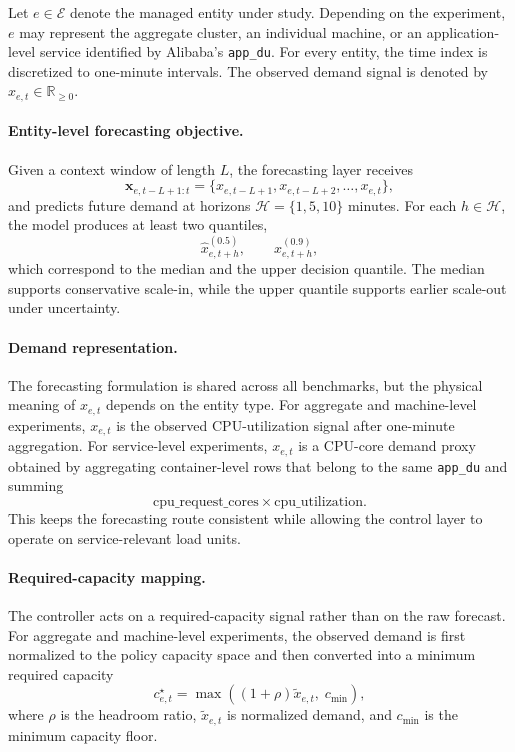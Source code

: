 Let $e \in \mathcal{E}$ denote the managed entity under study. Depending on the experiment, $e$ may represent the aggregate cluster, an individual machine, or an application-level service identified by Alibaba's \texttt{app\_du}. For every entity, the time index is discretized to one-minute intervals. The observed demand signal is denoted by $x_{e,t} \in \mathbb{R}_{\ge 0}$.

\paragraph{Entity-level forecasting objective.}
Given a context window of length $L$, the forecasting layer receives
\[
\mathbf{x}_{e,t-L+1:t} = \{x_{e,t-L+1}, x_{e,t-L+2}, \dots, x_{e,t}\},
\]
and predicts future demand at horizons $\mathcal{H}=\{1,5,10\}$ minutes. For each $h \in \mathcal{H}$, the model produces at least two quantiles,
\[
\hat{x}^{(0.5)}_{e,t+h}, \qquad \hat{x}^{(0.9)}_{e,t+h},
\]
which correspond to the median and the upper decision quantile. The median supports conservative scale-in, while the upper quantile supports earlier scale-out under uncertainty.

\paragraph{Demand representation.}
The forecasting formulation is shared across all benchmarks, but the physical meaning of $x_{e,t}$ depends on the entity type. For aggregate and machine-level experiments, $x_{e,t}$ is the observed CPU-utilization signal after one-minute aggregation. For service-level experiments, $x_{e,t}$ is a CPU-core demand proxy obtained by aggregating container-level rows that belong to the same \texttt{app\_du} and summing
\[
\text{cpu\_request\_cores} \times \text{cpu\_utilization}.
\]
This keeps the forecasting route consistent while allowing the control layer to operate on service-relevant load units.

\paragraph{Required-capacity mapping.}
The controller acts on a required-capacity signal rather than on the raw forecast. For aggregate and machine-level experiments, the observed demand is first normalized to the policy capacity space and then converted into a minimum required capacity
\[
c^\star_{e,t} = \max\left((1+\rho)\tilde{x}_{e,t},\; c_{\min}\right),
\]
where $\rho$ is the headroom ratio, $\tilde{x}_{e,t}$ is normalized demand, and $c_{\min}$ is the minimum capacity floor.

